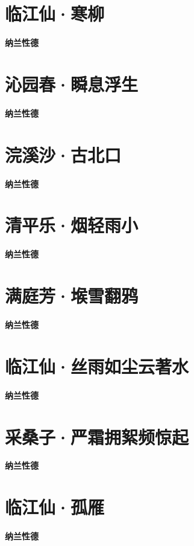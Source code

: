 \documentclass[12pt,a4paper]{ctexbook}
\begin{document}
\section{临江仙·寒柳}
\textbf{纳兰性德}\par\vspace{0.5em}

\section{沁园春·瞬息浮生}
\textbf{纳兰性德}\par\vspace{0.5em}

\section{浣溪沙·古北口}
\textbf{纳兰性德}\par\vspace{0.5em}

\section{清平乐·烟轻雨小}
\textbf{纳兰性德}\par\vspace{0.5em}

\section{满庭芳·堠雪翻鸦}
\textbf{纳兰性德}\par\vspace{0.5em}

\section{临江仙·丝雨如尘云著水}
\textbf{纳兰性德}\par\vspace{0.5em}

\section{采桑子·严霜拥絮频惊起}
\textbf{纳兰性德}\par\vspace{0.5em}

\section{临江仙·孤雁}
\textbf{纳兰性德}\par\vspace{0.5em}
\end{document}
